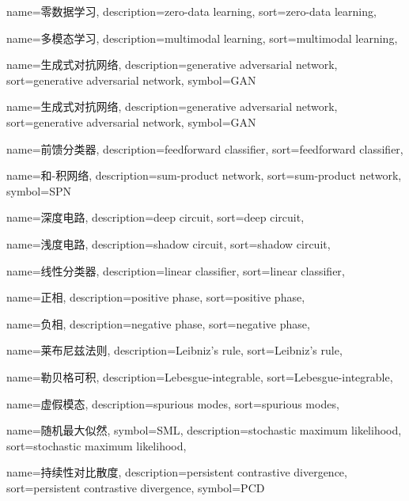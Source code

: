 {
  name=零数据学习,
  description={zero-data learning},
  sort={zero-data learning},
}

{
  name=多模态学习,
  description={multimodal learning},
  sort={multimodal learning},
}

{
  name=生成式对抗网络,
  description={generative adversarial network},
  sort={generative adversarial network},
  symbol={GAN}
}

{
  name=生成式对抗网络,
  description={generative adversarial network},
  sort={generative adversarial network},
  symbol={GAN}
}

{
  name=前馈分类器,
  description={feedforward classifier},
  sort={feedforward classifier},
}

{
  name=和-积网络,
  description={sum-product network},
  sort={sum-product network},
  symbol={SPN}
}

{
  name=深度电路,
  description={deep circuit},
  sort={deep circuit},
}

{
  name=浅度电路,
  description={shadow circuit},
  sort={shadow circuit},
}

{
  name=线性分类器,
  description={linear classifier},
  sort={linear classifier},
}

{
  name=正相,
  description={positive phase},
  sort={positive phase},
}

{
  name=负相,
  description={negative phase},
  sort={negative phase},
}

{
  name=莱布尼兹法则,
  description={Leibniz's rule},
  sort={Leibniz's rule},
}

{
  name=勒贝格可积,
  description={Lebesgue-integrable},
  sort={Lebesgue-integrable},
}

{
  name=虚假模态,
  description={spurious modes},
  sort={spurious modes},
}

{
  name=随机最大似然,
  symbol={SML},
  description={stochastic maximum likelihood},
  sort={stochastic maximum likelihood},
}

{
  name=持续性对比散度,
  description={persistent contrastive divergence},
  sort={persistent contrastive divergence},
  symbol={PCD}
}

